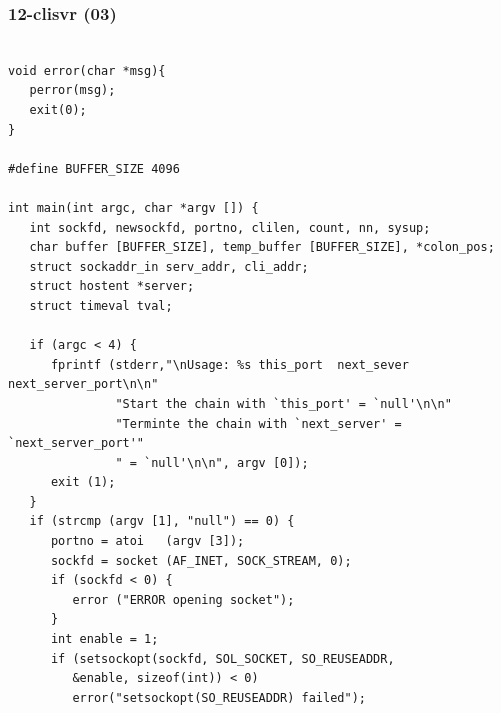 \documentclass[aspectratio=169, xcolor=table, notheorems, hyperref={pdfpagelabels=false}]{beamer}
\begin{document}
\begin{frame}[fragile]
\frametitle{12-clisvr (03)}
\begin{lstlisting}[basicstyle=\ttfamily\tiny]

void error(char *msg){
   perror(msg);
   exit(0);
}

#define BUFFER_SIZE 4096

int main(int argc, char *argv []) {
   int sockfd, newsockfd, portno, clilen, count, nn, sysup;
   char buffer [BUFFER_SIZE], temp_buffer [BUFFER_SIZE], *colon_pos;
   struct sockaddr_in serv_addr, cli_addr;
   struct hostent *server;
   struct timeval tval;

   if (argc < 4) {
      fprintf (stderr,"\nUsage: %s this_port  next_sever next_server_port\n\n"
               "Start the chain with `this_port' = `null'\n\n"
               "Terminte the chain with `next_server' = `next_server_port'"
               " = `null'\n\n", argv [0]);
      exit (1);
   }
   if (strcmp (argv [1], "null") == 0) {
      portno = atoi   (argv [3]);
      sockfd = socket (AF_INET, SOCK_STREAM, 0);
      if (sockfd < 0) {
         error ("ERROR opening socket");
      }
      int enable = 1;
      if (setsockopt(sockfd, SOL_SOCKET, SO_REUSEADDR, 
         &enable, sizeof(int)) < 0)
         error("setsockopt(SO_REUSEADDR) failed");

\end{lstlisting}
\end{frame}
\end{document}
